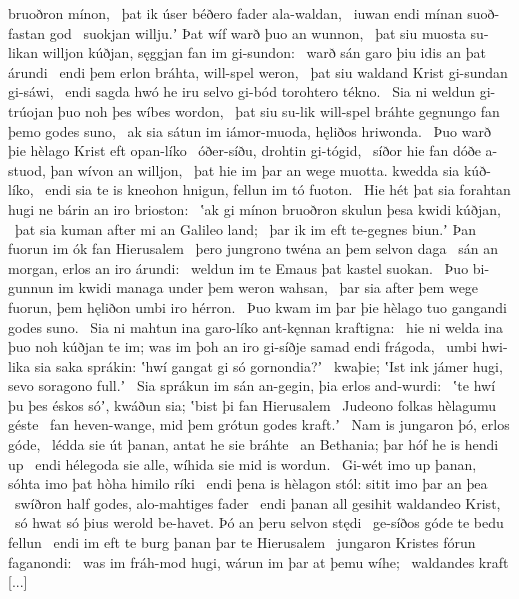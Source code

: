 bruoðron mínon, \hld\ þat ik úser béðero fader
ala-waldan, \hld\ iuwan endi mínan
suoð-fastan god \hld\ suokjan willju.ʼ
Þat wíf warð þuo an wunnon, \hld\ þat siu muosta su-likan willjon kúðjan,
sęggjan fan im gi-sundon: \hld\ warð sán garo
þiu idis an þat árundi \hld\ endi þem erlon bráhta,
will-spel weron, \hld\ þat siu waldand Krist
gi-sundan gi-sáwi, \hld\ endi sagda hwó he iru selvo gi-bód
torohtero tékno. \hld\ Sia ni weldun gi-trúojan þuo noh
þes wíbes wordon, \hld\ þat siu su-lik will-spel bráhte
gegnungo fan þemo godes suno, \hld\ ak sia sátun im iámor-muoda,
hęliðos hriwonda. \hld\ Þuo warð þie hèlago Krist
eft opan-líko \hld\ óðer-síðu,
drohtin gi-tógid, \hld\ síðor hie fan dóðe a-stuod,
þan wívon an willjon, \hld\ þat hie im þar an wege muotta.
kwedda sia kúð-líko, \hld\ endi sia te is kneohon hnigun,
fellun im tó fuoton. \hld\ Hie hét þat sia forahtan hugi
ne bárin an iro brioston: \hld\ ʽak gi mínon bruoðron skulun
þesa kwidi kúðjan, \hld\ þat sia kuman after mi
an Galileo land; \hld\ þar ik im eft te-gegnes biun.ʼ
Þan fuorun im ók fan Hierusalem \hld\ þero jungrono twéna
an þem selvon daga \hld\ sán an morgan,
erlos an iro árundi: \hld\ weldun im te Emaus
þat kastel suokan. \hld\ Þuo bi-gunnun im kwidi managa
under þem weron wahsan, \hld\ þar sia after þem wege fuorun,
þem hęliðon umbi iro hérron. \hld\ Þuo kwam im þar þie hèlago tuo
gangandi godes suno. \hld\ Sia ni mahtun ina garo-líko
ant-kęnnan kraftigna: \hld\ hie ni welda ina þuo noh kúðjan te im;
was im þoh an iro gi-síðje samad endi frágoda, \hld\ umbi hwi-lika sia saka sprákin:
ʽhwí gangat gi só gornondia?ʼ \hld\ kwaþie; ʽIst ink jámer hugi,
sevo soragono full.ʼ \hld\ Sia sprákun im sán an-gegin,
þia erlos and-wurdi: \hld\ ʽte hwí þu þes éskos sóʼ, kwáðun sia;
ʽbist þi fan Hierusalem \hld\ Judeono folkas
hèlagumu géste \hld\ fan heven-wange,
mid þem grótun godes kraft.ʼ \hld\ Nam is jungaron þó,
erlos góde, \hld\ lédda sie út þanan,
antat he sie bráhte \hld\ an Bethania;
þar hóf he is hendi up \hld\ endi hélegoda sie alle,
wíhida sie mid is wordun. \hld\ Gi-wét imo up þanan,
sóhta imo þat hòha himilo ríki \hld\ endi þena is hèlagon stól:
sitit imo þar an þea \hld\ swíðron half godes,
alo-mahtiges fader \hld\ endi þanan all gesihit
waldandeo Krist, \hld\ só hwat só þius werold be-havet.
Þó an þeru selvon stędi \hld\ ge-síðos góde
te bedu fellun \hld\ endi im eft te burg þanan
þar te Hierusalem \hld\ jungaron Kristes
fórun faganondi: \hld\ was im fráh-mod hugi,
wárun im þar at þemu wíhe; \hld\ waldandes kraft
[...]
